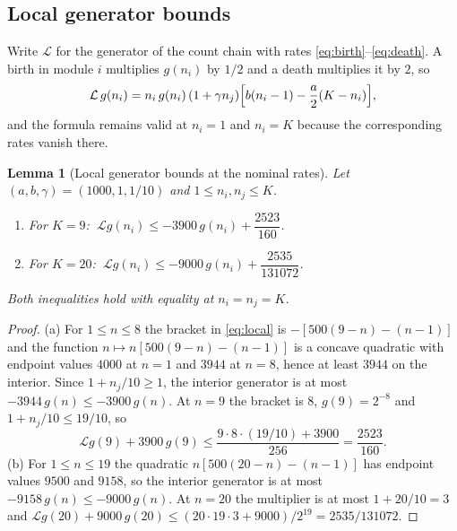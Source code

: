 \documentclass[11pt,a4paper]{article}
\theoremstyle{plain}
\newtheorem{lemma}[theorem]{Lemma}
\theoremstyle{definition}
\theoremstyle{remark}
\newcommand{\cL}{\mathcal L}
\begin{document}
\subsection{Local generator bounds}
Write $\cL$ for the generator of the count chain with rates \eqref{eq:birth}--\eqref{eq:death}. A birth in module $i$ multiplies $g(n_i)$ by $1/2$ and a death multiplies it by $2$, so
\begin{equation}\label{eq:local}
 \cL\,g(n_i)=n_i\,g(n_i)\,(1+\gamma n_j)\Bigl[b(n_i-1)-\frac a2(K-n_i)\Bigr],
\end{equation}
and the formula remains valid at $n_i=1$ and $n_i=K$ because the corresponding rates vanish there.

\begin{lemma}[Local generator bounds at the nominal rates]\label{lem:drift}
Let $(a,b,\gamma)=(1000,1,1/10)$ and $1\le n_i,n_j\le K$.
\begin{enumerate}[label=(\alph*)]
\item For $K=9$: $\ \cL g(n_i)\le-3900\,g(n_i)+\dfrac{2523}{160}$.
\item For $K=20$: $\ \cL g(n_i)\le-9000\,g(n_i)+\dfrac{2535}{131072}$.
\end{enumerate}
Both inequalities hold with equality at $n_i=n_j=K$.
\end{lemma}
\begin{proof}
(a) For $1\le n\le8$ the bracket in \eqref{eq:local} is $-[500(9-n)-(n-1)]$ and the function $n\mapsto n[500(9-n)-(n-1)]$ is a concave quadratic with endpoint values $4000$ at $n=1$ and $3944$ at $n=8$, hence at least $3944$ on the interior. Since $1+n_j/10\ge1$, the interior generator is at most $-3944\,g(n)\le-3900\,g(n)$. At $n=9$ the bracket is $8$, $g(9)=2^{-8}$ and $1+n_j/10\le19/10$, so
\[
 \cL g(9)+3900\,g(9)\le\frac{9\cdot8\cdot(19/10)+3900}{256}=\frac{2523}{160}.
\]
(b) For $1\le n\le19$ the quadratic $n[500(20-n)-(n-1)]$ has endpoint values $9500$ and $9158$, so the interior generator is at most $-9158\,g(n)\le-9000\,g(n)$. At $n=20$ the multiplier is at most $1+20/10=3$ and
$\cL g(20)+9000\,g(20)\le(20\cdot19\cdot3+9000)/2^{19}=2535/131072$.
\end{proof}
\end{document}
